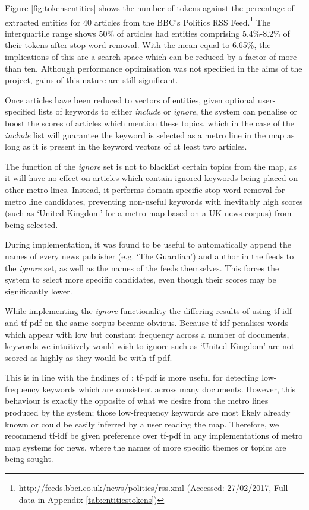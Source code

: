 Figure \ref{fig:tokensentities} shows the number of tokens against the percentage of extracted entities for 40 articles from the BBC's Politics RSS Feed.\footnote{http://feeds.bbci.co.uk/news/politics/rss.xml (Accessed: 27/02/2017, Full data in Appendix \ref{tab:entitiestokens})} The interquartile range shows 50\% of articles had entities comprising 5.4\%-8.2\% of their tokens after stop-word removal. With the mean equal to 6.65\%, the implications of this are a search space which can be reduced by a factor of more than ten. Although performance optimisation was not specified in the aims of the project, gains of this nature are still significant.

Once articles have been reduced to vectors of entities, given optional user-specified lists of keywords to either \textit{include} or \textit{ignore}, the system can penalise or boost the scores of articles which mention these topics, which in the case of the \textit{include} list will guarantee the keyword is selected as a metro line in the map as long as it is present in the keyword vectors of at least two articles. 

The function of the \textit{ignore} set is not to blacklist certain topics from the map, as it will have no effect on articles which contain ignored keywords being placed on other metro lines. Instead, it performs domain specific stop-word removal for metro line candidates, preventing non-useful keywords with inevitably high scores (such as `United Kingdom' for a metro map based on a UK news corpus) from being selected. 

During implementation, it was found to be useful to automatically append the names of every news publisher (e.g. `The Guardian') and author in the feeds to the \textit{ignore} set, as well as the names of the feeds themselves. This forces the system to select more specific candidates, even though their scores may be significantly lower.

While implementing the \textit{ignore} functionality the differing results of using tf-idf and tf-pdf on the same corpus became obvious. Because tf-idf penalises words which appear with low but constant frequency across a number of documents, keywords we intuitively would wish to ignore such as `United Kingdom' are not scored as highly as they would be with tf-pdf. 

This is in line with the findings of \citeauthor{TopicExtractionfromnewsArchiveUsingTFPDFAlgorithm}; tf-pdf is more useful for detecting low-frequency keywords which are consistent across many documents. However, this behaviour is exactly the opposite of what we desire from the  metro lines produced by the system; those low-frequency keywords are most likely already known or could be easily inferred by a user reading the map. Therefore, we recommend tf-idf be given preference over tf-pdf in any implementations of metro map systems for news, where the names of more specific themes or topics are being sought.


